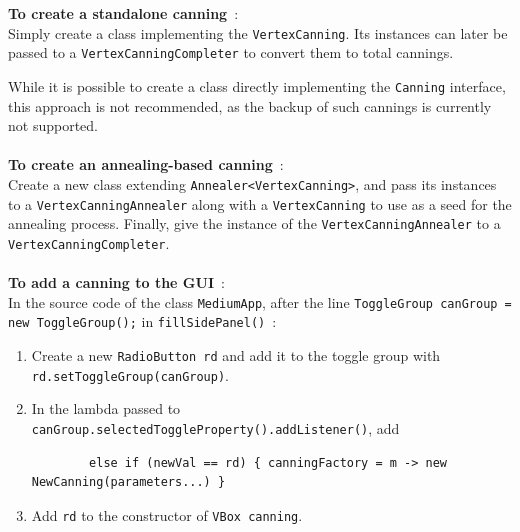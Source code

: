 \documentclass{report}
\begin{document}
\textbf{To create a standalone canning}~:\\
Simply create a class implementing the \verb|VertexCanning|. Its instances can later be passed to a \verb|VertexCanningCompleter| to convert them to total cannings.

While it is possible to create a class directly implementing the \verb|Canning| interface, this approach is not recommended, as the backup of such cannings is currently not supported.\\
$ $\\
\textbf{To create an annealing-based canning}~:\\
Create a new class extending \verb|Annealer<VertexCanning>|, and pass its instances to a \verb|VertexCanningAnnealer| along with a \verb|VertexCanning| to use as a seed for the annealing process. Finally, give the instance of the \verb|VertexCanningAnnealer| to a \verb|VertexCanningCompleter|.\\
$ $\\
\textbf{To add a canning to the GUI}~:\\
In the source code of the class \verb|MediumApp|, after the line \verb|ToggleGroup canGroup = new ToggleGroup();| in \verb|fillSidePanel()|~:
\begin{enumerate}
	\item Create a new \verb|RadioButton rd| and add it to the toggle group with \verb|rd.setToggleGroup(canGroup)|.
	
	\item In the lambda passed to \verb|canGroup.selectedToggleProperty().addListener()|, add 
	\begin{verbatim}
		else if (newVal == rd) { canningFactory = m -> new NewCanning(parameters...) }
	\end{verbatim}
	
	\item Add \verb|rd| to the constructor of \verb|VBox canning|.
\end{enumerate}



\printbibliography[heading=bibintoc]
\end{document}
